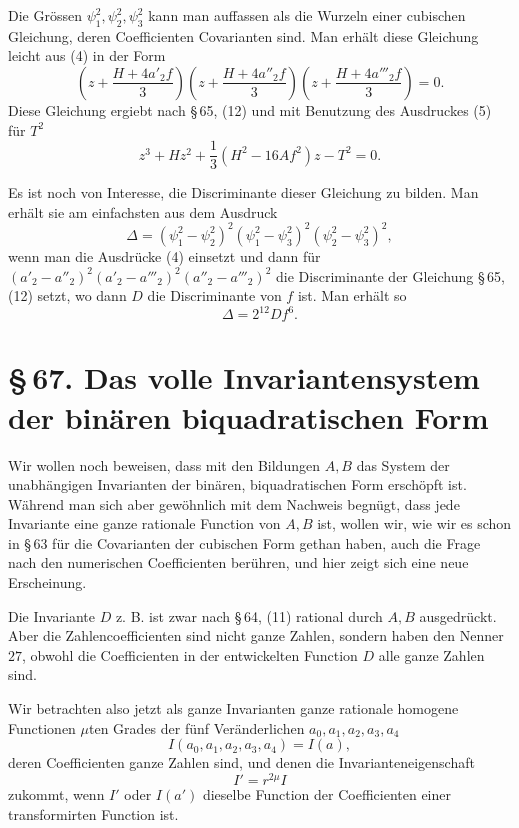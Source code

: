 \documentclass[11pt]{article}
\providecommand{\sect}[2]{\section*{\S\,#1. #2}}
\begin{document}
Die Grössen $\psi_1^2,\psi_2^2,\psi_3^2$ kann man auffassen als die Wurzeln einer cubischen Gleichung, deren Coefficienten Covarianten sind. Man erhält diese Gleichung leicht aus (4) in der Form
\[
 \left(z+\frac{H+4a'_2f}{3}\right)
 \left(z+\frac{H+4a''_2f}{3}\right)
 \left(z+\frac{H+4a'''_2f}{3}\right)=0.
\]
Diese Gleichung ergiebt nach \S\,65, (12) und mit Benutzung des Ausdruckes (5) für $T^2$
\begin{equation}
 z^3+Hz^2+\frac13(H^2-16Af^2)z-T^2=0.
\tag{7}
\end{equation}

Es ist noch von Interesse, die Discriminante dieser Gleichung zu bilden. Man erhält sie am einfachsten aus dem Ausdruck
\[
 \Delta=(\psi_1^2-\psi_2^2)^2(\psi_1^2-\psi_3^2)^2(\psi_2^2-\psi_3^2)^2,
\]
wenn man die Ausdrücke (4) einsetzt und dann für $(a'_2-a''_2)^2(a'_2-a'''_2)^2(a''_2-a'''_2)^2$ die Discriminante der Gleichung \S\,65, (12) setzt, wo dann $D$ die Discriminante von $f$ ist. Man erhält so
\begin{equation}
 \Delta=2^{12}Df^6.
\tag{8}
\end{equation}

\sect{67}{Das volle Invariantensystem der binären biquadratischen Form}

Wir wollen noch beweisen, dass mit den Bildungen $A,B$ das System der unabhängigen Invarianten der binären, biquadratischen Form erschöpft ist. Während man sich aber gewöhnlich mit dem Nachweis begnügt, dass jede Invariante eine ganze rationale Function von $A,B$ ist, wollen wir, wie wir es schon in \S\,63 für die Covarianten der cubischen Form gethan haben, auch die Frage nach den numerischen Coefficienten berühren, und hier zeigt sich eine neue Erscheinung.

Die Invariante $D$ z. B. ist zwar nach \S\,64, (11) rational durch $A,B$ ausgedrückt. Aber die Zahlencoefficienten sind nicht ganze Zahlen, sondern haben den Nenner $27$, obwohl die Coefficienten in der entwickelten Function $D$ alle ganze Zahlen sind.

Wir betrachten also jetzt als ganze Invarianten ganze rationale homogene Functionen $\mu$ten Grades der fünf Veränderlichen $a_0,a_1,a_2,a_3,a_4$
\begin{equation}
 I(a_0,a_1,a_2,a_3,a_4)=I(a),
\tag{1}
\end{equation}
deren Coefficienten ganze Zahlen sind, und denen die Invarianteneigenschaft
\begin{equation}
 I'=r^{2\mu}I
\tag{2}
\end{equation}
zukommt, wenn $I'$ oder $I(a')$ dieselbe Function der Coefficienten einer transformirten Function ist.
\end{document}
